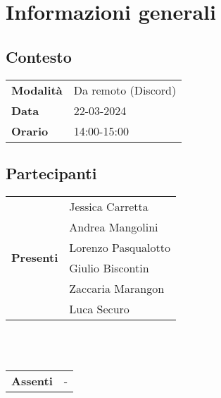 \section{Informazioni generali}
    \subsection{Contesto}
        \begin{tabular}{ p{2.2cm} | l }
            \textbf{Modalità} & Da remoto (Discord)\\  %
            \textbf{Data} & 22-03-2024\\    %
            \textbf{Orario} & 14:00-15:00   %
        \end{tabular}

        \subsection{Partecipanti}

        \begin{tabular}{ p{2.2cm} | l }   %
            \multirow{6}{*}{\textbf{Presenti}} 
                & Jessica Carretta \\
                & Andrea Mangolini \\
                & Lorenzo Pasqualotto \\
                & Giulio Biscontin \\
                & Zaccaria Marangon \\
                & Luca Securo
        \end{tabular} 
        \\
        \vspace*{0.2cm}
        \\
        \begin{tabular}{ p{2.2cm} | l }   %
            \multirow{1}{*}{\textbf{Assenti}} & -
        \end{tabular} 
        \\
        \\